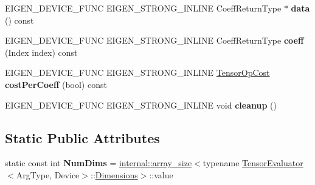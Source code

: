 \begin{DoxyCompactItemize}
E\+I\+G\+E\+N\+\_\+\+D\+E\+V\+I\+C\+E\+\_\+\+F\+U\+NC E\+I\+G\+E\+N\+\_\+\+S\+T\+R\+O\+N\+G\+\_\+\+I\+N\+L\+I\+NE Coeff\+Return\+Type $\ast$ {\bfseries data} () const
\item 
\mbox{\label{struct_eigen_1_1_tensor_evaluator_3_01const_01_tensor_scan_op_3_01_op_00_01_arg_type_01_4_00_01_device_01_4_a0703003e85562fd90000c9d791d18889}} 
E\+I\+G\+E\+N\+\_\+\+D\+E\+V\+I\+C\+E\+\_\+\+F\+U\+NC E\+I\+G\+E\+N\+\_\+\+S\+T\+R\+O\+N\+G\+\_\+\+I\+N\+L\+I\+NE Coeff\+Return\+Type {\bfseries coeff} (Index index) const
\item 
\mbox{\label{struct_eigen_1_1_tensor_evaluator_3_01const_01_tensor_scan_op_3_01_op_00_01_arg_type_01_4_00_01_device_01_4_afec6afac064f8242daaea8a149574223}} 
E\+I\+G\+E\+N\+\_\+\+D\+E\+V\+I\+C\+E\+\_\+\+F\+U\+NC E\+I\+G\+E\+N\+\_\+\+S\+T\+R\+O\+N\+G\+\_\+\+I\+N\+L\+I\+NE \hyperlink{class_eigen_1_1_tensor_op_cost}{Tensor\+Op\+Cost} {\bfseries cost\+Per\+Coeff} (bool) const
\item 
\mbox{\label{struct_eigen_1_1_tensor_evaluator_3_01const_01_tensor_scan_op_3_01_op_00_01_arg_type_01_4_00_01_device_01_4_ac8bc0e2e65872986497524d3c9682912}} 
E\+I\+G\+E\+N\+\_\+\+D\+E\+V\+I\+C\+E\+\_\+\+F\+U\+NC E\+I\+G\+E\+N\+\_\+\+S\+T\+R\+O\+N\+G\+\_\+\+I\+N\+L\+I\+NE void {\bfseries cleanup} ()
\end{DoxyCompactItemize}
\subsection*{Static Public Attributes}
\begin{DoxyCompactItemize}
\item 
\mbox{\label{struct_eigen_1_1_tensor_evaluator_3_01const_01_tensor_scan_op_3_01_op_00_01_arg_type_01_4_00_01_device_01_4_abee6865d1af3e14277181db1010ee499}} 
static const int {\bfseries Num\+Dims} = \hyperlink{struct_eigen_1_1internal_1_1array__size}{internal\+::array\+\_\+size}$<$typename \hyperlink{struct_eigen_1_1_tensor_evaluator}{Tensor\+Evaluator}$<$Arg\+Type, Device$>$\+::\hyperlink{struct_eigen_1_1_d_sizes}{Dimensions}$>$\+::value
\end{DoxyCompactItemize}
